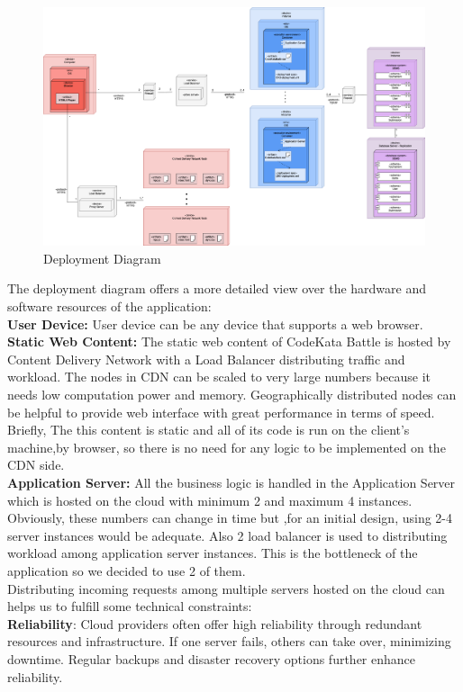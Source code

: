 \begin{figure}[H]
    \centering
    \includegraphics[scale=0.25]{Images/DD-deployment.drawio.png}
    \caption{Deployment Diagram}
\end{figure}

The deployment diagram offers a more detailed view over the hardware and software resources of the application:
\\
\indent \textbf{User Device:} User device can be any device that supports a web browser.
\\
\indent \textbf{Static Web Content:} The static web content of CodeKata Battle is hosted by Content Delivery Network with a Load Balancer distributing traffic and workload. The nodes in CDN can be scaled to very large numbers because it needs low computation power and memory. Geographically distributed nodes can be helpful to provide web interface with great performance in terms of speed. Briefly, The this content is static and all of its code is run on the
client’s machine,by browser, so there is no need for any logic to be implemented on the CDN side.
\\
\indent \textbf{Application Server:} All the business logic is handled in the Application Server which is hosted on the cloud with minimum 2 and maximum 4 instances. Obviously, these numbers can change in time but ,for an initial design, using 2-4 server instances would be adequate. Also 2 load balancer is used to distributing workload among application server instances. This is the bottleneck of the application so we decided to use 2 of them.
\\
\indent Distributing incoming requests among multiple servers hosted on the cloud can helps us to fulfill some technical constraints:
\\
\indent \textbf{Reliability}: Cloud providers often offer high reliability through redundant resources and infrastructure. If one server fails, others can take over, minimizing downtime. Regular backups and disaster recovery options further enhance reliability.

